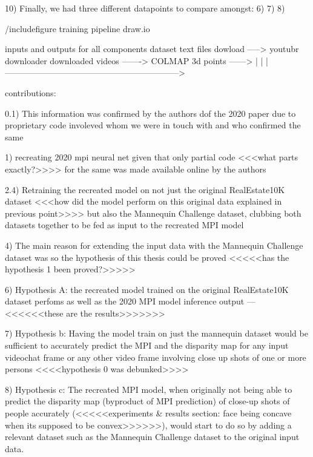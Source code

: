 10) Finally, we had three different datapoints to compare amongst: 6) 7) 8)



 
/include{figure} training pipeline 
draw.io


inputs and outputs for all components 
dataset text files dowload -----> youtubr downloader downloaded videos -------> COLMAP 3d points ------> 
                                        |
                                        |
                                        |-------------------------------------------------------------->

contributions:







    0.1) This information was confirmed by the authors dof the 2020 paper due to proprietary code involeved whom we were in touch with and who confirmed the same
   
1) recreating 2020 mpi neural net given that only partial code <<<what parts exactly?>>>> for the same was made available online by the authors 

    2.4) Retraining the recreated model on not just the original RealEstate10K dataset <<<how did the model perform on this original data explained in previous point>>>> but also the Mannequin Challenge dataset, clubbing both datasets together to be fed as input to the recreated MPI model

4) The main reason for extending the input data with the Mannequin Challenge dataset was so the hypothesis of this thesis could be proved <<<<<has the hypothesis 1 been proved?>>>>>

6) Hypothesis A: the recreated model trained on the original RealEstate10K dataset perfoms as well as the 2020 MPI model inference output --- <<<<<<these are the results>>>>>>> 

7) Hypothesis b: Having the model train on just the mannequin dataset would be sufficient to accurately predict the MPI and the disparity map for any input videochat frame or any other video frame involving close up shots of one or more persons <<<<hypothesis 0 was debunked>>>>

8) Hypothesis c: The recreated MPI model, when originally not being able to predict the disparity map (byproduct of MPI prediction) of close-up shots of people accurately (<<<<<experiments & results section: face being concave when its supposed to be convex>>>>>>), would start to do so by adding a relevant dataset such as the Mannequin Challenge dataset to the original input data.



